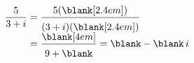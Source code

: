 {\renewcommand{\arraystretch}{1.3}$\begin{array}{@{}r@{}l@{}} \dfrac{5}{3+i} & {}=\dfrac{5(\blank[2.4em])\rule[-0.7ex]{0pt}{0pt}}{\rule{0pt}{2.6ex}(3+i)(\blank[2.4em])} \\[1.2ex] & {}=\dfrac{\blank[4em]\rule[-0.7ex]{0pt}{0pt}}{\rule{0pt}{2.6ex}9+\blank}=\blank-\blank\,i \end{array}$}
